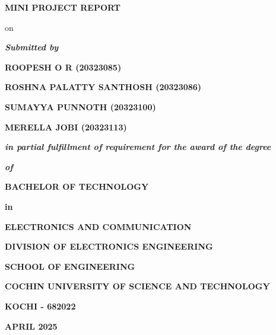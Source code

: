 \begin{titlepage}
	\titlepagefont
	\centering

	{\sectionFont \textbf{MINI PROJECT REPORT} \par}
	\vspace{.2cm}
	{\sectionFont on \par}
	\vspace{.5cm}

	{ \par}

	\vspace{1cm}

	{\textit{\textbf{Submitted by}} \par}
	\vspace{.5cm}

	\textbf {ROOPESH O R (20323085)} \par
	\textbf {ROSHNA PALATTY SANTHOSH (20323086)} \par
	\textbf {SUMAYYA PUNNOTH (20323100)} \par
	\textbf {MERELLA JOBI (20323113)} \par

	\vspace{1cm}
	{\textit{\textbf{in partial fulfillment of requirement for the award of the degree} }\par}
	{\textit{\textbf{of}}} \par
	\vspace{.6cm}
	{\textbf{BACHELOR OF TECHNOLOGY} \par}
	{\textbf{in}} \par
	{\textbf{ELECTRONICS AND COMMUNICATION} \par}
	\vspace{1cm}

	\par

	\vspace{1cm}

	{\textbf{DIVISION OF ELECTRONICS ENGINEERING} \par}
	{\textbf{SCHOOL OF ENGINEERING} \par}
	{\textbf{COCHIN UNIVERSITY OF SCIENCE AND TECHNOLOGY} \par}
	{\textbf{KOCHI - 682022} \par}

	\vspace{.5cm}

	{\textbf{APRIL 2025} \par}

	\vspace*{\fill}

\end{titlepage}